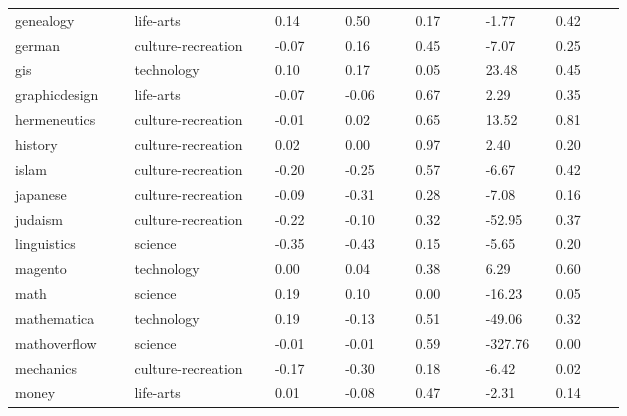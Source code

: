 \begin{longtabu}{@{}
	p{0.17\linewidth}
	p{0.2\linewidth}
	P{0.1\linewidth}
	P{0.1\linewidth}
	P{0.1\linewidth}
	P{0.1\linewidth}
	p{0.1\linewidth}@{}}
genealogy        & life-arts          & 0.14           & 0.50           & 0.17   & -1.77             & 0.42             \\
german           & culture-recreation & -0.07          & 0.16           & 0.45   & -7.07             & 0.25             \\
gis              & technology         & 0.10           & 0.17           & 0.05   & 23.48             & 0.45             \\
graphicdesign    & life-arts          & -0.07          & -0.06          & 0.67   & 2.29              & 0.35             \\
hermeneutics     & culture-recreation & -0.01          & 0.02           & 0.65   & 13.52             & 0.81             \\
history          & culture-recreation & 0.02           & 0.00           & 0.97   & 2.40              & 0.20             \\
islam            & culture-recreation & -0.20          & -0.25          & 0.57   & -6.67             & 0.42             \\
japanese         & culture-recreation & -0.09          & -0.31          & 0.28   & -7.08             & 0.16             \\
judaism          & culture-recreation & -0.22          & -0.10          & 0.32   & -52.95            & 0.37             \\
linguistics      & science            & -0.35          & -0.43          & 0.15   & -5.65             & 0.20             \\
magento          & technology         & 0.00           & 0.04           & 0.38   & 6.29              & 0.60             \\
math             & science            & 0.19           & 0.10           & 0.00   & -16.23            & 0.05             \\
mathematica      & technology         & 0.19           & -0.13          & 0.51   & -49.06            & 0.32             \\
mathoverflow     & science            & -0.01          & -0.01          & 0.59   & -327.76           & 0.00             \\
mechanics        & culture-recreation & -0.17          & -0.30          & 0.18   & -6.42             & 0.02             \\
money            & life-arts          & 0.01           & -0.08          & 0.47   & -2.31             & 0.14             \\

\end{longtabu}

